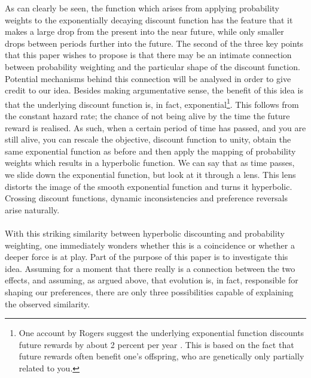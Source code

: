 \documentclass[a4paper,10pt]{article}
\numberwithin{equation}{section}
\begin{document}
As can clearly be seen, the function which arises from applying probability weights to the exponentially decaying discount function has the feature that it makes a large drop from the present into the near future, while only smaller drops between periods further into the future. The second of the three key points that this paper wishes to propose is that there may be an intimate connection between probability weighting and the particular shape of the discount function. Potential mechanisms behind this connection will be analysed in order to give credit to our idea. Besides making argumentative sense, the benefit of this idea is that the underlying discount function is, in fact, exponential\footnote{One account by Rogers suggest the underlying exponential function discounts future rewards by about 2 percent per year \cite{Rogers1994}. This is based on the fact that future rewards often benefit one's offspring, who are genetically only partially related to you.}. This follows from the constant hazard rate; the chance of not being alive by the time the future reward is realised. As such, when a certain period of time has passed, and you are still alive, you can rescale the objective, discount function to unity, obtain the same exponential function as before and then apply the mapping of probability weights which results in a hyperbolic function. We can say that as time passes, we slide down the exponential function, but look at it through a lens. This lens distorts the image of the smooth exponential function and turns it hyperbolic. Crossing discount functions, dynamic inconsistencies and preference reversals arise naturally.\\
\\
With this striking similarity between hyperbolic discounting and probability weighting, one immediately wonders whether this is a coincidence or whether a deeper force is at play. Part of the purpose of this paper is to investigate this idea. Assuming for a moment that there really is a connection between the two effects, and assuming, as argued above, that evolution is, in fact, responsible for shaping our preferences, there are only three possibilities capable of explaining the observed similarity.
 
\end{document}
